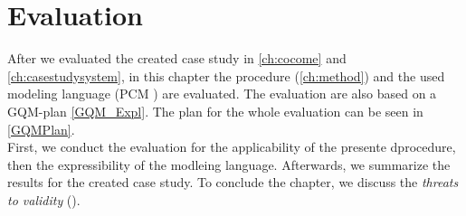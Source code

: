 
\chapter{Evaluation}
\label{ch:eval}
After we evaluated the created case study in \autoref{ch:cocome} and \autoref{ch:casestudysystem}, in this chapter the procedure (\autoref{ch:method}) and the used modeling language (PCM \cite{PCM}) are evaluated. The evaluation are also based on a GQM-plan \autoref{GQM_Expl}. The plan for the whole evaluation can be seen in \autoref{GQMPlan}. \\ First, we conduct the evaluation for the applicability of the presente dprocedure, then the expressibility of the modleing language. Afterwards, we summarize the results for the created case study. To conclude the chapter, we discuss the \textit{threats to validity} (\cite{TtoV}).

